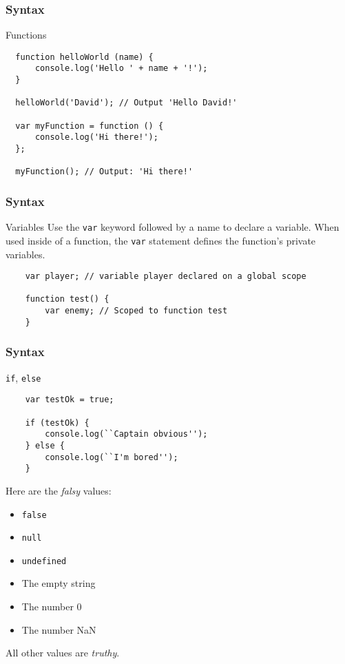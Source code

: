 \begin{frame}[fragile]
  \frametitle{Syntax}

  \begin{block}{Functions}
  {\scriptsize
  \begin{verbatim}
  function helloWorld (name) {
      console.log('Hello ' + name + '!');
  }

  helloWorld('David'); // Output 'Hello David!'

  var myFunction = function () {
      console.log('Hi there!');
  };

  myFunction(); // Output: 'Hi there!'
  \end{verbatim}
  }
  \end{block}
\end{frame}

\begin{frame}[fragile]
  \frametitle{Syntax}

  \begin{block}{Variables}
    Use the \texttt{var} keyword followed by a name to declare a variable. When used inside of a function, the \texttt{var} statement defines the function's private variables.
    {\scriptsize
    \begin{verbatim}
    var player; // variable player declared on a global scope

    function test() {
        var enemy; // Scoped to function test
    }
    \end{verbatim}
    }
  \end{block}
\end{frame}

\begin{frame}[fragile]
  \frametitle{Syntax}

  \begin{block}{\texttt{if}, \texttt{else}}
    \scriptsize{
    \begin{verbatim}
    var testOk = true;

    if (testOk) {
        console.log(``Captain obvious'');
    } else {
        console.log(``I'm bored'');
    }
    \end{verbatim}
    }
    Here are the \textit{falsy} values:
    \begin{itemize}
      \item \texttt{false}
      \item \texttt{null}
      \item \texttt{undefined}
      \item The empty string
      \item The number 0
      \item The number NaN
    \end{itemize}
    All other values are \textit{truthy}.
  \end{block}
\end{frame}

